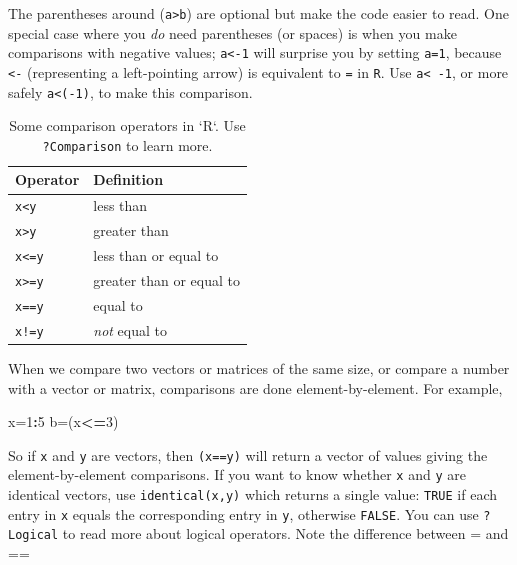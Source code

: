 \documentclass[11pt,]{article}
\newenvironment{Shaded}{\begin{snugshade}}{\end{snugshade}}
\newcommand{\DecValTok}[1]{\textcolor[rgb]{0.00,0.00,0.81}{#1}}
\newcommand{\NormalTok}[1]{#1}
\newcommand{\OperatorTok}[1]{\textcolor[rgb]{0.81,0.36,0.00}{\textbf{#1}}}
\begin{document}
The parentheses around (\texttt{a\textgreater{}b}) are optional but make the code easier to read.
One special case where you \emph{do} need parentheses (or spaces) is when you make comparisons with negative values; \texttt{a\textless{}-1} will surprise you by setting \texttt{a=1},
because \texttt{\textless{}-} (representing a left-pointing arrow) is equivalent to \texttt{=} in \texttt{R}. Use \texttt{a\textless{}\ -1}, or more safely \texttt{a\textless{}(-1)}, to make this comparison.

\begin{table}

\caption{\label{tab:unnamed-chunk-67}Some comparison operators in `R`. Use \texttt{?Comparison} to learn more.}
\centering
\begin{tabular}[t]{ll}
\toprule
Operator & Definition\\
\midrule
\texttt{x<y} & less than\\
\texttt{x>y} & greater than\\
\texttt{x<=y} & less than or equal to\\
\texttt{x>=y} & greater than or equal to\\
\texttt{x==y} & equal to\\
\addlinespace
\texttt{x!=y} & \emph{not} equal to\\
\bottomrule
\end{tabular}
\end{table}

When we compare two vectors or matrices of the same size, or compare a
number with a vector or matrix, comparisons are done element-by-element.
For example,

\begin{Shaded}
\begin{Highlighting}[]
\NormalTok{x=}\DecValTok{1}\OperatorTok{:}\DecValTok{5}
\NormalTok{b=(x}\OperatorTok{<=}\DecValTok{3}\NormalTok{)}
\end{Highlighting}
\end{Shaded}

So if \texttt{x} and \texttt{y} are vectors, then \texttt{(x==y)} will return a vector of values giving the element-by-element comparisons. If you want to know whether \texttt{x} and \texttt{y} are identical vectors, use \texttt{identical(x,y)} which returns a single value: \texttt{TRUE} if each entry in \texttt{x} equals the corresponding entry in \texttt{y}, otherwise \texttt{FALSE}. You can use \texttt{?Logical} to read more about logical operators. Note the difference between = and ==
\end{document}
